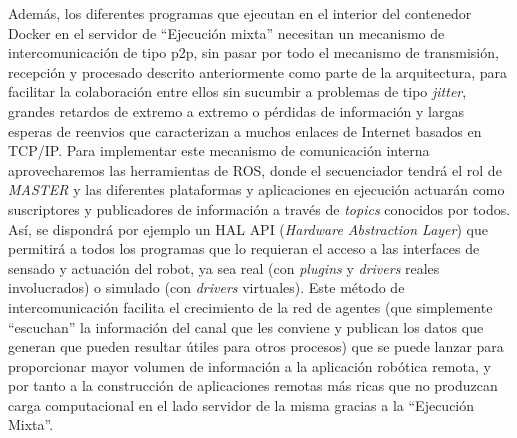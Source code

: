 Además, los diferentes programas que ejecutan en el interior del contenedor Docker en el servidor de ``Ejecución mixta'' necesitan un mecanismo de intercomunicación de tipo p2p, sin pasar por todo el mecanismo de transmisión, recepción y procesado descrito anteriormente como parte de la arquitectura, para facilitar la colaboración entre ellos sin sucumbir a problemas de tipo \textit{jitter}, grandes retardos de extremo a extremo o pérdidas de información y largas esperas de reenvios que caracterizan a muchos enlaces de Internet basados en TCP/IP. Para implementar este mecanismo de comunicación interna aprovecharemos las herramientas de ROS, donde el secuenciador tendrá el rol de \textit{MASTER} y las diferentes plataformas y aplicaciones en ejecución actuarán como suscriptores y publicadores de información a través de \textit{topics} conocidos por todos. Así, se dispondrá por ejemplo un HAL API (\textit{Hardware Abstraction Layer}) que permitirá a todos los programas que lo requieran el acceso a las interfaces de sensado y actuación del robot, ya sea real (con \textit{plugins} y \textit{drivers} reales involucrados) o simulado (con \textit{drivers} virtuales). Este método de intercomunicación facilita el crecimiento de la red de agentes (que simplemente ``escuchan'' la información del canal que les conviene y publican los datos que generan que pueden resultar útiles para otros procesos) que se puede lanzar para proporcionar mayor volumen de información a la aplicación robótica remota, y por tanto a la construcción de aplicaciones remotas más ricas que no produzcan carga computacional en el lado servidor de la misma gracias a la ``Ejecución Mixta''.